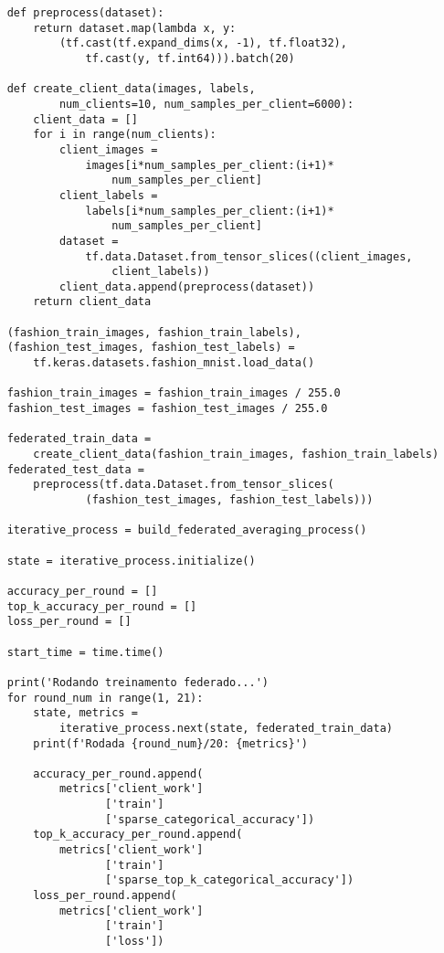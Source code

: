 \begin{lstlisting}
    def preprocess(dataset):
        return dataset.map(lambda x, y: 
            (tf.cast(tf.expand_dims(x, -1), tf.float32), 
                tf.cast(y, tf.int64))).batch(20)

    def create_client_data(images, labels, 
            num_clients=10, num_samples_per_client=6000):
        client_data = []
        for i in range(num_clients):
            client_images = 
                images[i*num_samples_per_client:(i+1)*
                    num_samples_per_client]
            client_labels = 
                labels[i*num_samples_per_client:(i+1)*
                    num_samples_per_client]
            dataset = 
                tf.data.Dataset.from_tensor_slices((client_images,
                    client_labels))
            client_data.append(preprocess(dataset))
        return client_data

    (fashion_train_images, fashion_train_labels),
    (fashion_test_images, fashion_test_labels) = 
        tf.keras.datasets.fashion_mnist.load_data()

    fashion_train_images = fashion_train_images / 255.0
    fashion_test_images = fashion_test_images / 255.0

    federated_train_data = 
        create_client_data(fashion_train_images, fashion_train_labels)
    federated_test_data = 
        preprocess(tf.data.Dataset.from_tensor_slices(
                (fashion_test_images, fashion_test_labels)))

    iterative_process = build_federated_averaging_process()

    state = iterative_process.initialize()

    accuracy_per_round = []
    top_k_accuracy_per_round = []
    loss_per_round = []

    start_time = time.time()

    print('Rodando treinamento federado...')
    for round_num in range(1, 21):
        state, metrics = 
            iterative_process.next(state, federated_train_data)
        print(f'Rodada {round_num}/20: {metrics}')

        accuracy_per_round.append(
            metrics['client_work']
                   ['train']
                   ['sparse_categorical_accuracy'])
        top_k_accuracy_per_round.append(
            metrics['client_work']
                   ['train']
                   ['sparse_top_k_categorical_accuracy'])
        loss_per_round.append(
            metrics['client_work']
                   ['train']
                   ['loss'])


\end{lstlisting}
